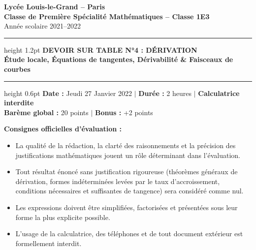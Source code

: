 \documentclass[11pt,a4paper]{article}
\begin{document}
\begin{center}
    {\LARGE \bfseries Lycée Louis-le-Grand -- Paris}\\[0.2cm]
    {\large \textbf{Classe de Première Spécialité Mathématiques -- Classe 1E3}}\\[0.15cm]
    {\normalsize Année scolaire 2021--2022}\\[0.35cm]
    \hrule height 1.2pt
    \vspace{0.25cm}
    {\LARGE \bfseries DEVOIR SUR TABLE N°4 : DÉRIVATION}\\[0.15cm]
    {\large \textbf{Étude locale, Équations de tangentes, Dérivabilité \& Faisceaux de courbes}}\\[0.2cm]
    \hrule height 0.6pt
    \vspace{0.25cm}
    {\small \textbf{Date :} Jeudi 27 Janvier 2022 \quad $\vert$ \quad \textbf{Durée :} 2 heures \quad $\vert$ \quad \textbf{Calculatrice interdite}}\\[0.1cm]
    {\small \textbf{Barème global :} 20 points \quad $\vert$ \quad \textbf{Bonus :} +2 points}
\end{center}

\vspace{0.3cm}

\begin{tcolorbox}[colback=llglight,colframe=llgblue,arc=1.5mm,boxrule=0.7pt]
\textbf{Consignes officielles d'évaluation :}
\begin{itemize}[leftmargin=*,itemsep=2pt]
    \item La qualité de la rédaction, la clarté des raisonnements et la précision des justifications mathématiques jouent un rôle déterminant dans l'évaluation.
    \item Tout résultat énoncé sans justification rigoureuse (théorèmes généraux de dérivation, formes indéterminées levées par le taux d'accroissement, conditions nécessaires et suffisantes de tangence) sera considéré comme nul.
    \item Les expressions doivent être simplifiées, factorisées et présentées sous leur forme la plus explicite possible.
    \item L'usage de la calculatrice, des téléphones et de tout document extérieur est formellement interdit.
\end{itemize}
\end{tcolorbox}
\end{document}
